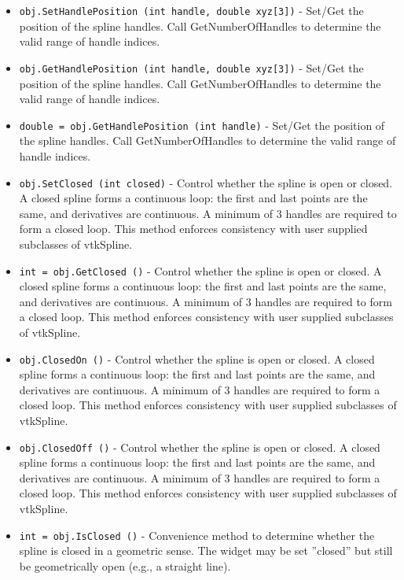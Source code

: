 \begin{itemize}
\item  \verb|obj.SetHandlePosition (int handle, double xyz[3])| -  Set/Get the position of the spline handles. Call GetNumberOfHandles
 to determine the valid range of handle indices.

\item  \verb|obj.GetHandlePosition (int handle, double xyz[3])| -  Set/Get the position of the spline handles. Call GetNumberOfHandles
 to determine the valid range of handle indices.

\item  \verb|double = obj.GetHandlePosition (int handle)| -  Set/Get the position of the spline handles. Call GetNumberOfHandles
 to determine the valid range of handle indices.

\item  \verb|obj.SetClosed (int closed)| -  Control whether the spline is open or closed. A closed spline forms
 a continuous loop: the first and last points are the same, and
 derivatives are continuous.  A minimum of 3 handles are required to
 form a closed loop.  This method enforces consistency with
 user supplied subclasses of vtkSpline.

\item  \verb|int = obj.GetClosed ()| -  Control whether the spline is open or closed. A closed spline forms
 a continuous loop: the first and last points are the same, and
 derivatives are continuous.  A minimum of 3 handles are required to
 form a closed loop.  This method enforces consistency with
 user supplied subclasses of vtkSpline.

\item  \verb|obj.ClosedOn ()| -  Control whether the spline is open or closed. A closed spline forms
 a continuous loop: the first and last points are the same, and
 derivatives are continuous.  A minimum of 3 handles are required to
 form a closed loop.  This method enforces consistency with
 user supplied subclasses of vtkSpline.

\item  \verb|obj.ClosedOff ()| -  Control whether the spline is open or closed. A closed spline forms
 a continuous loop: the first and last points are the same, and
 derivatives are continuous.  A minimum of 3 handles are required to
 form a closed loop.  This method enforces consistency with
 user supplied subclasses of vtkSpline.

\item  \verb|int = obj.IsClosed ()| -  Convenience method to determine whether the spline is
 closed in a geometric sense.  The widget may be set ''closed'' but still
 be geometrically open (e.g., a straight line).


\end{itemize}
